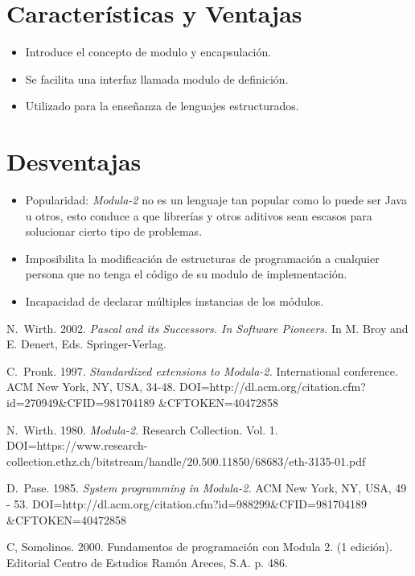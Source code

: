 \documentclass[10pt,journal,compsoc]{IEEEtran}
\begin{document}
\section{Caracter\'isticas y Ventajas}
\begin{itemize}
	\item Introduce el concepto de modulo y encapsulaci\'on.
	\item Se facilita una interfaz llamada modulo de definici\'on.
	\item Utilizado para la ense\~nanza de lenguajes estructurados.
\end{itemize}


\section{Desventajas}
\begin{itemize}
	\item Popularidad: \emph{Modula-2} no es un lenguaje tan popular como lo puede ser Java u otros, esto conduce a que librer\'ias y otros aditivos sean escasos para solucionar cierto tipo de problemas.
	\item Imposibilita la modificaci\'on de estructuras de programaci\'on a cualquier persona que no tenga el c\'odigo de su modulo de implementaci\'on.
	\item Incapacidad de declarar m\'ultiples instancias de los m\'odulos.
\end{itemize}

\begin{thebibliography}{3}
	
	N.~Wirth. 2002. \emph{Pascal and its Successors. In Software Pioneers.} In M. Broy and E. Denert, Eds. Springer-Verlag.
	
	C.~Pronk. 1997. \emph{Standardized extensions to Modula-2.} International conference. ACM New York, NY, USA, 34-48. DOI=http://dl.acm.org/citation.cfm?id=270949\&CFID=981704189
	\&CFTOKEN=40472858
	
	N.~Wirth. 1980. \emph{Modula-2.} Research Collection. Vol. 1. DOI=https://www.research-collection.ethz.ch/bitstream/handle/20.500.11850/68683/eth-3135-01.pdf
	
	D.~Pase. 1985. \emph{System programming in Modula-2.} ACM New York, NY, USA, 49 - 53. DOI=http://dl.acm.org/citation.cfm?id=988299\&CFID=981704189
	\&CFTOKEN=40472858
	
	C, Somolinos. 2000. Fundamentos de programaci\'on con Modula 2. (1 edición). Editorial Centro de Estudios Ram\'on Areces, S.A. p. 486. 
	
\end{thebibliography}
\end{document}
